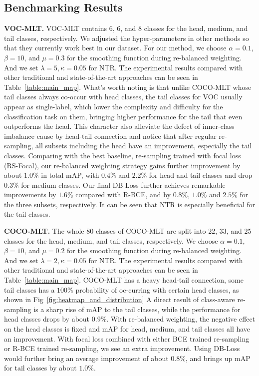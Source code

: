 \documentclass[runningheads]{llncs}
\begin{document}
\subsection{Benchmarking Results} 

\noindent\textbf{VOC-MLT.}
VOC-MLT contains 6, 6, and 8 classes for the head, medium, and tail classes, respectively. 
We adjusted the hyper-parameters in other methods so that they currently work best in our dataset.
For our method, we choose $\alpha=0.1$, $\beta=10$, and $\mu=0.3$ for the smoothing function during re-balanced weighting.
And we set $\lambda=5, \kappa=0.05$ for NTR.
The experimental results compared with other traditional and state-of-the-art approaches can be seen in Table~\ref{table:main_map}.
What's worth noting is that unlike COCO-MLT whose tail classes always co-occur with head classes, the tail classes for VOC usually appear as single-label, which lower the complexity and difficulty for the classification task on them, bringing higher performance for the tail that even outperforms the head.
This character also alleviate the defect of inner-class imbalance cause by head-tail connection and notice that after regular re-sampling, all subsets including the head have an improvement, especially the tail classes.
Comparing with the best baseline, re-sampling trained with focal loss (RS-Focal), our re-balanced weighting strategy gains further improvement by about $1.0\%$ in total mAP, with $0.4\%$ and $2.2\%$ for head and tail classes and drop $0.3\%$ for medium classes.
Our final DB-Loss further achieves remarkable improvements by $1.6\%$ compared with R-BCE, and by $0.8\%$, $1.0\%$ and $2.5\%$ for the three subsets, respectively. It can be seen that NTR is especially beneficial for the tail classes.

\noindent\textbf{COCO-MLT.}
The whole 80 classes of COCO-MLT are split into 22, 33, and 25 classes for the head, medium, and tail classes, respectively.
We choose $\alpha=0.1$, $\beta=10$, and $\mu=0.2$ for the smoothing function during re-balanced weighting.
And we set $\lambda=2, \kappa=0.05$ for NTR.
The experimental results compared with other traditional and state-of-the-art approaches can be seen in Table~\ref{table:main_map}.
COCO-MLT has a heavy head-tail connection, \ie some tail classes has a $100\%$ probability of oc-curring with certain head classes, as shown in Fig~\ref{fig:heatmap_and_distribution} A direct result of class-aware re-sampling is a sharp rise of mAP to the tail classes, while the performance for head classes drops by about $0.9\%$. With re-balanced weighting, the negative effect on the head classes is fixed and mAP for head, medium, and tail classes all have an improvement.
With focal loss combined with either BCE trained re-sampling or R-BCE trained re-sampling, we see an extra improvement.
Using DB-Loss would further bring an average improvement of about $0.8\%$, and brings up mAP for tail classes by about $1.0\%$.
\end{document}
